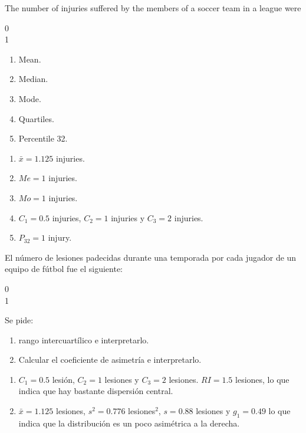 {The number of injuries suffered by the members of a soccer team in a league were
\begin{center}
0            \\
1           
\end{center}
\begin{enumerate}
\item Mean.
\item Median.
\item Mode.
\item Quartiles.
\item Percentile 32.
\end{enumerate}
}
{\begin{enumerate}
\item $\bar{x}= 1.125$ injuries.
\item $Me=1$ injuries.
\item $Mo=1$ injuries.
\item $C_1 = 0.5$ injuries, $C_2=1$ injuries y $C_3=2$ injuries.
\item $P_{32}=1$ injury.
\end{enumerate}
}
{}


{El número de lesiones padecidas durante una temporada por cada jugador de un equipo de fútbol fue el siguiente:
\begin{center}
0            \\
1           
\end{center}
Se pide:
\begin{enumerate}
\item rango intercuartílico e interpretarlo.
\item Calcular el coeficiente de asimetría e interpretarlo.
\end{enumerate}
}
{\begin{enumerate}
\item $C_1 = 0.5$ lesión, $C_2=1$ lesiones y $C_3=2$ lesiones. $RI=1.5$ lesiones, lo que indica que hay bastante dispersión central.
\item $\bar{x}= 1.125$ lesiones, $s^2= 0.776$ lesiones$^2$, $s= 0.88$ lesiones y $g_1=0.49$ lo que indica que la distribución es un poco asimétrica a la derecha.
\end{enumerate}
}
{}


